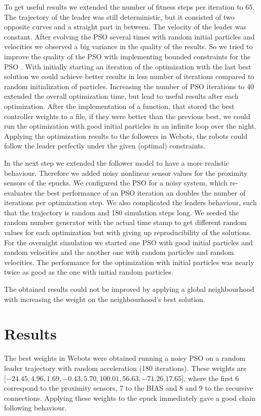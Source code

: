\documentclass[a4paper, 10pt, conference]{ieeeconf}      %
\begin{document}
To get useful results we extended the number of fitness steps per iteration to 65. The trajectory of the leader was still deterministic, but it consisted of two opposite curves and a straight part in between. The velocity of the leader was constant. After evolving the PSO several times with random initial particles and velocities we observed a big variance in the quality of the results. So we tried to improve the quality of the PSO with implementing bounded constraints for the PSO \cite{c1}. With initially starting an iteration of the optimization with the last best solution we could achieve better results in less number of iterations compared to random initialization of particles. Increasing the number of PSO iterations to 40 extended the overall optimization time, but lead to useful results after each optimization. After the implementation of a function, that stored the best controller weights to a file, if they were better than the previous best, we could run the optimization with good initial particles in an infinite loop over the night. Applying the optimization results to the followers in Webots, the robots could follow the leader perfectly under the given (optimal) constraints.

In the next step we extended the follower model to have a more realistic behaviour. Therefore we added noisy nonlinear sensor values for the proximity sensors of the epucks. We configured the PSO for a noisy system, which re-evaluates the best performance of an PSO iteration an doubles the number of iterations per optimization step. We also complicated the leaders behaviour, such that the trajectory is random and 180 simulation steps long. We seeded the random number generator with the actual time stamp to get different random values for each optimization but with giving up reproducibility of the solutions. For the overnight simulation we started one PSO with good initial particles and random velocities and the another one with random particles and random velocities. The performance for the optimization with initial particles was nearly twice as good as the one with initial random particles.

The obtained results could not be improved by applying a global neighbourhood with increasing the weight on the neighbourhood’s best solution.

\section{Results}
The best weights in Webots were obtained running a noisy PSO on a random leader trajectory with random acceleration (180 iterations). These weights are $[-24.45, 4.96, 1.69, -0.43, 5.70, 100.01, 56.63, -71.26$,$17.65]$, where the first 6 correspond to the proximity sensors, 7 to the BIAS and 8 and 9 to the recursive connections. Applying these weights to the epuck immediately gave a good chain following behaviour.
\end{document}
